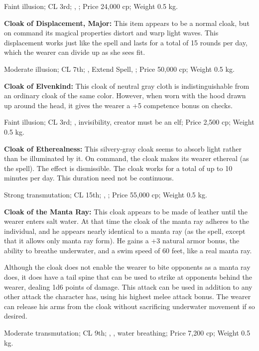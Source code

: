 Faint illusion; CL 3rd; , ; Price 24,000 cp; Weight 0.5 kg.


\textbf{Cloak of Displacement, Major:} This item appears to be a normal cloak, but on command its magical properties distort and warp light waves. This displacement works just like the  spell and lasts for a total of 15 rounds per day, which the wearer can divide up as she sees fit.

Moderate illusion; CL 7th; , Extend Spell, ; Price 50,000 cp; Weight 0.5 kg.


\textbf{Cloak of Elvenkind:} This cloak of neutral gray cloth is indistinguishable from an ordinary cloak of the same color. However, when worn with the hood drawn up around the head, it gives the wearer a +5 competence bonus on  checks.

Faint illusion; CL 3rd; , invisibility, creator must be an elf; Price 2,500 cp; Weight 0.5 kg.


\textbf{Cloak of Etherealness:} This silvery-gray cloak seems to absorb light rather than be illuminated by it. On command, the cloak makes its wearer ethereal (as the  spell). The effect is dismissible. The cloak works for a total of up to 10 minutes per day. This duration need not be continuous.

Strong transmutation; CL 15th; , ; Price 55,000 cp; Weight 0.5 kg.


\textbf{Cloak of the Manta Ray:} This cloak appears to be made of leather until the wearer enters salt water. At that time the cloak of the manta ray adheres to the individual, and he appears nearly identical to a manta ray (as the  spell, except that it allows only manta ray form). He gains a +3 natural armor bonus, the ability to breathe underwater, and a swim speed of 60 feet, like a real manta ray.

Although the cloak does not enable the wearer to bite opponents as a manta ray does, it does have a tail spine that can be used to strike at opponents behind the wearer, dealing 1d6 points of damage. This attack can be used in addition to any other attack the character has, using his highest melee attack bonus. The wearer can release his arms from the cloak without sacrificing underwater movement if so desired.

Moderate transmutation; CL 9th; , , water breathing; Price 7,200 cp; Weight 0.5 kg.


